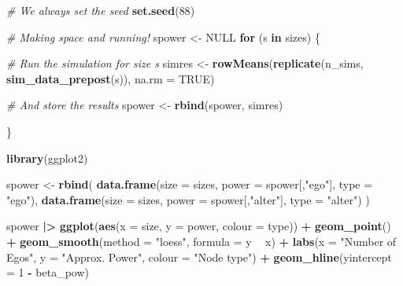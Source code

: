 \documentclass[]{book}
\newenvironment{Shaded}{\begin{snugshade}}{\end{snugshade}}
\newcommand{\CommentTok}[1]{\textcolor[rgb]{0.56,0.35,0.01}{\textit{#1}}}
\newcommand{\ControlFlowTok}[1]{\textcolor[rgb]{0.13,0.29,0.53}{\textbf{#1}}}
\newcommand{\DataTypeTok}[1]{\textcolor[rgb]{0.13,0.29,0.53}{#1}}
\newcommand{\DecValTok}[1]{\textcolor[rgb]{0.00,0.00,0.81}{#1}}
\newcommand{\ErrorTok}[1]{\textcolor[rgb]{0.64,0.00,0.00}{\textbf{#1}}}
\newcommand{\KeywordTok}[1]{\textcolor[rgb]{0.13,0.29,0.53}{\textbf{#1}}}
\newcommand{\NormalTok}[1]{#1}
\newcommand{\OperatorTok}[1]{\textcolor[rgb]{0.81,0.36,0.00}{\textbf{#1}}}
\newcommand{\OtherTok}[1]{\textcolor[rgb]{0.56,0.35,0.01}{#1}}
\newcommand{\StringTok}[1]{\textcolor[rgb]{0.31,0.60,0.02}{#1}}
\begin{document}
\begin{Shaded}
\begin{Highlighting}[]
\CommentTok{# We always set the seed}
\KeywordTok{set.seed}\NormalTok{(}\DecValTok{88}\NormalTok{)}

\CommentTok{# Making space and running!}
\NormalTok{spower <-}\StringTok{ }\OtherTok{NULL}
\ControlFlowTok{for}\NormalTok{ (s }\ControlFlowTok{in}\NormalTok{ sizes) \{}

  \CommentTok{# Run the simulation for size s}
\NormalTok{  simres <-}\StringTok{ }\KeywordTok{rowMeans}\NormalTok{(}\KeywordTok{replicate}\NormalTok{(n_sims, }\KeywordTok{sim_data_prepost}\NormalTok{(s)), }\DataTypeTok{na.rm =} \OtherTok{TRUE}\NormalTok{)}

  \CommentTok{# And store the results}
\NormalTok{  spower <-}\StringTok{ }\KeywordTok{rbind}\NormalTok{(spower, simres)}

\NormalTok{\}}
\end{Highlighting}
\end{Shaded}

\begin{Shaded}
\begin{Highlighting}[]
\KeywordTok{library}\NormalTok{(ggplot2)}

\NormalTok{spower <-}\StringTok{ }\KeywordTok{rbind}\NormalTok{(}
  \KeywordTok{data.frame}\NormalTok{(}\DataTypeTok{size =}\NormalTok{ sizes, }\DataTypeTok{power =}\NormalTok{ spower[,}\StringTok{"ego"}\NormalTok{], }\DataTypeTok{type =}  \StringTok{"ego"}\NormalTok{),}
  \KeywordTok{data.frame}\NormalTok{(}\DataTypeTok{size =}\NormalTok{ sizes, }\DataTypeTok{power =}\NormalTok{ spower[,}\StringTok{"alter"}\NormalTok{], }\DataTypeTok{type =}  \StringTok{"alter"}\NormalTok{)}
\NormalTok{)}

\NormalTok{spower }\OperatorTok{|}\ErrorTok{>}
\StringTok{  }\KeywordTok{ggplot}\NormalTok{(}\KeywordTok{aes}\NormalTok{(}\DataTypeTok{x =}\NormalTok{ size, }\DataTypeTok{y =}\NormalTok{ power, }\DataTypeTok{colour =}\NormalTok{ type)) }\OperatorTok{+}
\StringTok{  }\KeywordTok{geom_point}\NormalTok{() }\OperatorTok{+}
\StringTok{  }\KeywordTok{geom_smooth}\NormalTok{(}\DataTypeTok{method =} \StringTok{"loess"}\NormalTok{, }\DataTypeTok{formula =}\NormalTok{ y }\OperatorTok{~}\StringTok{ }\NormalTok{x) }\OperatorTok{+}
\StringTok{  }\KeywordTok{labs}\NormalTok{(}\DataTypeTok{x =} \StringTok{"Number of Egos"}\NormalTok{, }\DataTypeTok{y =} \StringTok{"Approx. Power"}\NormalTok{, }\DataTypeTok{colour =} \StringTok{"Node type"}\NormalTok{) }\OperatorTok{+}
\StringTok{  }\KeywordTok{geom_hline}\NormalTok{(}\DataTypeTok{yintercept =} \DecValTok{1} \OperatorTok{-}\StringTok{ }\NormalTok{beta_pow)}
\end{Highlighting}
\end{Shaded}
\end{document}
